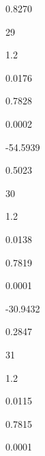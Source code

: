 \documentclass[a4paper,portrait,12pt]{article}
\begin{document}
0.8270





29





1.2





0.0176





0.7828





0.0002





-54.5939





0.5023





30





1.2





0.0138





0.7819





0.0001





-30.9432





0.2847





31





1.2





0.0115





0.7815





0.0001
\end{document}
